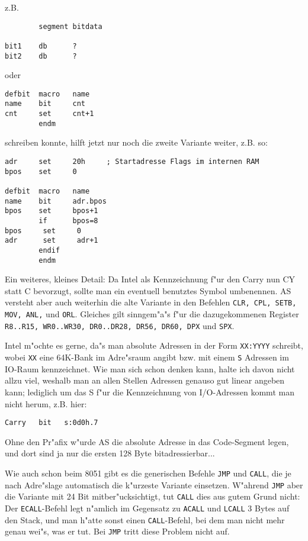 \documentclass[12pt,a4paper,twoside]{report}
\newcommand{\tty}[1]{{\tt #1}}
\begin{document}
z.B.
\begin{verbatim}
        segment bitdata

bit1    db      ?
bit2    db      ?
\end{verbatim}
oder
\begin{verbatim}
defbit	macro   name
name    bit     cnt
cnt     set     cnt+1
        endm
\end{verbatim}
schreiben konnte, hilft jetzt nur noch die zweite Variante weiter, z.B.
so:
\begin{verbatim}
adr     set     20h     ; Startadresse Flags im internen RAM
bpos    set     0

defbit  macro   name
name    bit     adr.bpos
bpos    set     bpos+1
        if      bpos=8
bpos     set     0
adr      set     adr+1
        endif
        endm
\end{verbatim}
Ein weiteres, kleines Detail: Da Intel als Kennzeichnung f"ur den Carry
nun CY statt C bevorzugt, sollte man ein eventuell benutztes Symbol
umbenennen.  AS versteht aber auch weiterhin die alte Variante in den
Befehlen \tty{CLR, CPL, SETB, MOV, ANL,} und \tty{ORL}.  Gleiches gilt
sinngem"a"s f"ur die dazugekommenen Register \tty{R8..R15, WR0..WR30,
DR0..DR28, DR56, DR60, DPX} und \tty{SPX}.
\par
Intel m"ochte es gerne, da"s man absolute Adressen in der Form \tty{XX:YYYY}
schreibt, wobei \tty{XX} eine 64K-Bank im Adre"sraum angibt bzw. mit einem
\tty{S} Adressen im IO-Raum kennzeichnet.  Wie man sich schon denken kann,
halte ich davon nicht allzu viel, weshalb man an allen Stellen Adressen
genauso gut linear angeben kann; lediglich um das S f"ur die Kennzeichnung
von I/O-Adressen kommt man nicht herum, z.B. hier:
\begin{verbatim}
Carry   bit   s:0d0h.7
\end{verbatim}
Ohne den Pr"afix w"urde AS die absolute Adresse in das Code-Segment
legen, und dort sind ja nur die ersten 128 Byte bitadressierbar...
\par
Wie auch schon beim 8051 gibt es die generischen Befehle \tty{JMP} und
\tty{CALL}, die je nach Adre"slage automatisch die k"urzeste Variante
einsetzen.  W"ahrend \tty{JMP} aber die Variante mit 24 Bit mitber"ucksichtigt,
tut \tty{CALL} dies aus gutem Grund nicht: Der \tty{ECALL}-Befehl legt
n"amlich im Gegensatz zu \tty{ACALL} und \tty{LCALL} 3 Bytes auf den
Stack, und man h"atte sonst einen \tty{CALL}-Befehl, bei dem man nicht
mehr genau wei"s, was er tut.  Bei \tty{JMP} tritt diese Problem nicht auf.
\par
\end{document}
